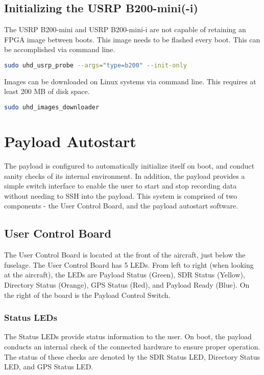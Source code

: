 \documentclass{report}
\begin{document}
			\subsection{Initializing the USRP B200-mini(-i)}
				The USRP B200-mini and USRP B200-mini-i are not capable of retaining an FPGA image between boots.  This image needs to be flashed every boot.  This can be accomplished via command line.

				\begin{lstlisting}[language=bash]
sudo uhd_usrp_probe --args="type=b200" --init-only
				\end{lstlisting}

				Images can be downloaded on Linux systems via command line.  This requires at least 200 MB of disk space.

				\begin{lstlisting}[language=bash]
sudo uhd_images_downloader
				\end{lstlisting}
		\section{Payload Autostart}
			The payload is configured to automatically initialize itself on boot, and conduct sanity checks of its internal environment.  In addition, the payload provides a simple switch interface to enable the user to start and stop recording data without needing to SSH into the payload.  This system is comprised of two components - the User Control Board, and the payload autostart software.
			\subsection{User Control Board}
					The User Control Board is located at the front of the aircraft, just below the fuselage.  The User Control Board has 5 LEDs.  From left to right (when looking at the aircraft), the LEDs are Payload Status (Green), SDR Status (Yellow), Directory Status (Orange), GPS Status (Red), and Payload Ready (Blue).  On the right of the board is the Payload Control Switch.

						\subsubsection{Status LEDs}
							The Status LEDs provide status information to the user.  On boot, the payload conducts an internal check of the connected hardware to ensure proper operation.  The status of these checks are denoted by the SDR Status LED, Directory Status LED, and GPS Status LED.
\end{document}
